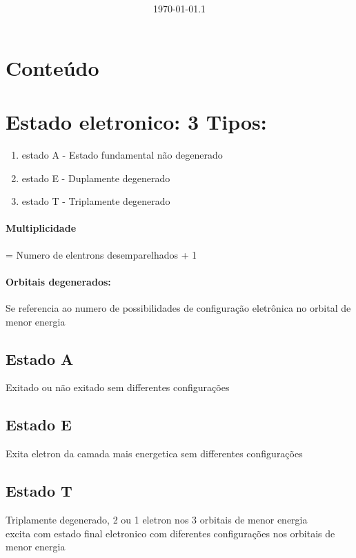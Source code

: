 \documentclass[12pt]{article}
\title{\bfseries\color{DarkGreen!75!}%
	\mytitle%
}
\author{\myauthor}
\date{\today.1}
\begin{document}


\maketitle



\renewcommand{\contentsname}{} %

\section*{Conteúdo}
\begin{multicols}{2} \tableofcontents \end{multicols}


\restoregeometry


\section{Estado eletronico: 3 Tipos:}

\begin{enumerate}

	\item estado A - Estado fundamental não degenerado
	\item estado E - Duplamente degenerado
	\item estado T - Triplamente degenerado
	
\end{enumerate}

\paragraph{Multiplicidade}
= Numero de elentrons desemparelhados + 1

\paragraph{Orbitais degenerados:}
Se referencia ao numero de possibilidades de configuração eletrônica no orbital de menor energia

\begin{multicols}{2}

\subsection{Estado A}
Exitado ou não exitado sem differentes configurações

\subsection{Estado E}
Exita eletron da camada mais energetica sem differentes configurações

\subsection{Estado T}
Triplamente degenerado, 2 ou 1 eletron nos 3 orbitais de menor energia\\
excita com estado final eletronico com diferentes configurações nos orbitais de menor energia

\end{multicols}
\end{document}
